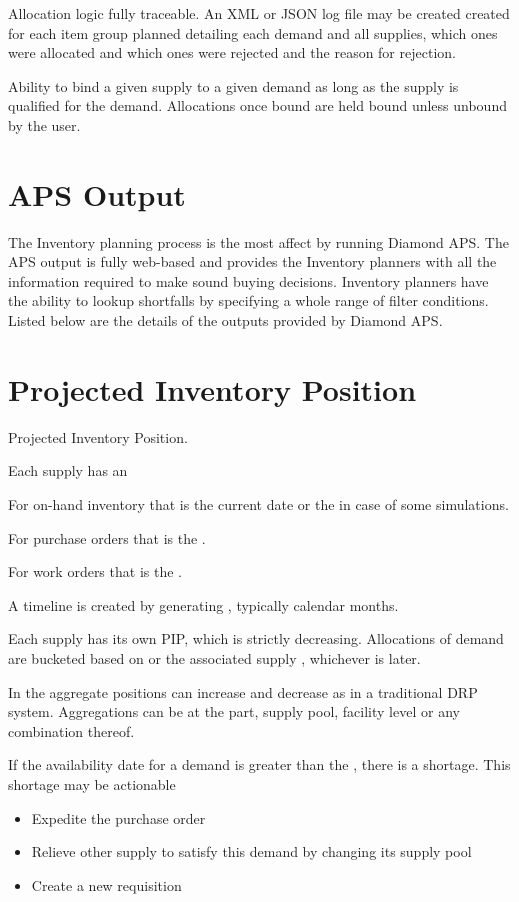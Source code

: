 \documentclass[letterpaper,10pt,english]{sphinxmanual}
\begin{document}
Allocation logic fully traceable. An XML or JSON log file may be created created
for each item group planned detailing each demand and all supplies,
which ones were allocated and which ones were rejected and the reason
for rejection.

Ability to bind a given supply to a given demand as long as the supply
is qualified for the demand. Allocations once bound are held bound
unless unbound by the user.


\section{APS Output}
\label{\detokenize{index:aps-output}}
The Inventory planning process is the most affect by running Diamond
APS. The APS output is fully web-based and provides the Inventory
planners with all the information required to make sound buying
decisions. Inventory planners have the ability to lookup shortfalls by
specifying a whole range of filter conditions. Listed below are the
details of the outputs provided by Diamond APS.


\section{Projected Inventory Position}
\label{\detokenize{index:projected-inventory-position}}
 Projected Inventory Position.

Each supply has an 

For on-hand inventory that is the current date or the  in case of some
simulations.

For purchase orders that is the .

For work orders that is the .

A timeline is created by generating , typically calendar months.

Each supply has its own PIP, which is strictly decreasing.  Allocations of demand are bucketed based on 
or the associated supply , whichever is later.

In the aggregate positions can increase and decrease as in a traditional DRP system.  Aggregations can
be at the part, supply pool, facility level or any combination thereof.

If the availability date for a demand is greater than the , there is a shortage.  This shortage
may be actionable
\begin{itemize}
\item {} 
Expedite the purchase order

\item {} 
Relieve other supply to satisfy this demand by changing its supply pool

\item {} 
Create a new requisition

\end{itemize}
\end{document}
